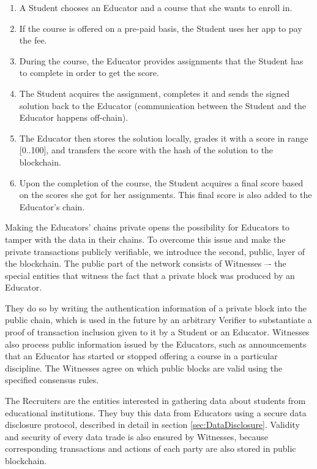 \begin{enumerate}
\item A Student chooses an Educator and a course that she wants to enroll in.
\item If the course is offered on a pre-paid basis, the Student uses her app to
  pay the fee.
\item During the course, the Educator provides assignments that the Student has
  to complete in order to get the score.
\item The Student acquires the assignment, completes it and sends the signed
  solution back to the Educator (communication between the Student and the
  Educator happens off-chain).
\item The Educator then stores the solution locally, grades it with a score in
  range [0..100],  and transfers the score with the hash of the solution to the
  blockchain.
\item Upon the completion of the course, the Student acquires a final score
  based on the scores she got for her assignments. This final score is also
  added to the Educator’s chain.
\end{enumerate}

Making the Educators' chains private opens the possibility for Educators to
tamper with the data in their chains. To overcome this issue and make the
private transactions publicly verifiable, we introduce the second, public, layer
of the blockchain. The public part of the network consists of Witnesses –- the
special entities that witness the fact that a private block was produced by an
Educator.

They do so by writing the authentication information of a private block into the
public chain, which is used in the future by an arbitrary Verifier to
substantiate a proof of transaction inclusion given to it by a Student or an
Educator. Witnesses also process public information issued by the Educators,
such as announcements that an Educator has started or stopped offering a course
in a particular discipline. The Witnesses agree on which public blocks are valid
using the specified consensus rules.

The Recruiters are the entities interested in gathering data about students from
educational institutions. They buy this data from Educators using a secure data
disclosure protocol, described in detail in section \ref{sec:DataDisclosure}.
Validity and security of every data trade is also ensured by Witnesses, because
corresponding transactions and actions of each party are also stored in public
blockchain.
